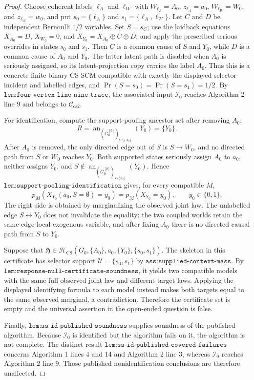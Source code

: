 \documentclass{article}
\begin{document}
\begin{proof}
Choose coherent labels \(\ell_A\) and \(\ell_W\) with \(W_{\ell_A}=A_0\), \(z_{\ell_A}=a_0\), \(W_{\ell_W}=W_0\), and \(z_{\ell_W}=w_0\), and put \(s_0=\{\ell_A\}\) and \(s_1=\{\ell_A,\ell_W\}\). Let \(C\) and \(D\) be independent Bernoulli \(1/2\) variables. Set \(S=s_C\); use the laidback equations \(X_{A_0}=D\), \(X_{W_0}=0\), and \(X_{Y_0}=X_{A_0}\oplus C\oplus D\); and apply the prescribed serious overrides in states \(s_0\) and \(s_1\). Then \(C\) is a common cause of \(S\) and \(Y_0\), while \(D\) is a common cause of \(A_0\) and \(Y_0\). The latter latent path is disabled when \(A_0\) is seriously assigned, so its latent-projection copy carries the label \(A_0\). Thus this is a concrete finite binary CS-SCM compatible with exactly the displayed selector-incident and labelled edges, and \(\Pr(S=s_0)=\Pr(S=s_1)=1/2\). By \(\texttt{lem:four-vertex-line-nine-trace}\), the associated input \(\mathcal I_0\) reaches Algorithm 2 line 9 and belongs to \(\mathcal C_{\mathrm{cs2}}\).

For identification, compute the support-pooling ancestor set after removing \(A_0\):
\[
R=\operatorname{an}_{(\bar G_0^{[\emptyset]})_{V^\circ\setminus\{A_0\}}}(Y_0)=\{Y_0\}.
\]
After \(A_0\) is removed, the only directed edge out of \(S\) is \(S\to W_0\), and no directed path from \(S\) or \(W_0\) reaches \(Y_0\). Both supported states seriously assign \(A_0\) to \(a_0\), neither assigns \(Y_0\), and \(S\notin\operatorname{an}_{(\bar G_0^{[\emptyset]})_{V\setminus\{A_0\}}}(Y_0)\). Hence \(\texttt{lem:support-pooling-identification}\) gives, for every compatible \(M\),
\[
p_M(X_{Y_0}(a_0,S=\emptyset)=y_0)=p_M(X_{Y_0}=y_0),\qquad y_0\in\{0,1\}.
\]
The right side is obtained by marginalizing the observed joint law. The unlabelled edge \(S\leftrightarrow Y_0\) does not invalidate the equality: the two coupled worlds retain the same edge-local exogenous variable, and after fixing \(A_0\) there is no directed causal path from \(S\) to \(Y_0\).

Suppose that \(\mathfrak H\in\mathcal H_{\mathrm{CS}}(\bar G_0,\{A_0\},a_0,\{Y_0\},\{s_0,s_1\})\). The skeleton in this certificate has selector support \(\mathcal U=\{s_0,s_1\}\) by \(\texttt{ass:supplied-context-mass}\). By \(\texttt{lem:response-null-certificate-soundness}\), it yields two compatible models with the same full observed joint law and different target laws. Applying the displayed identifying formula to each model instead makes both targets equal to the same observed marginal, a contradiction. Therefore the certificate set is empty and the universal assertion in the open-ended question is false.

Finally, \(\texttt{lem:ss-id-published-soundness}\) supplies soundness of the published algorithm. Because \(\mathcal I_0\) is identified but the algorithm fails on it, the algorithm is not complete. The distinct result \(\texttt{lem:ss-id-published-covered-failures}\) concerns Algorithm 1 lines 4 and 14 and Algorithm 2 line 3, whereas \(\mathcal I_0\) reaches Algorithm 2 line 9. Those published nonidentification conclusions are therefore unaffected.
\end{proof}
\end{document}
